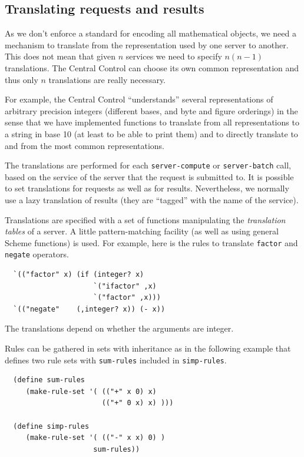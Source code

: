 \documentclass {article}
\begin{document}
\subsection{ Translating requests and results}

As we don't enforce a standard for encoding all mathematical objects, we need
a mechanism to translate from the representation used by one server to another.
This does not mean that given $n$ services we need to specify $n (n - 1)$
translations. The Central Control can choose its own common representation
and thus only $n$ translations are really necessary.

For example, the Central Control ``understands'' several representations of
arbitrary precision integers (different bases, and byte and figure
orderings) in the sense that we have implemented functions to translate from
all representations to a string in base 10 (at least to be able to print
them) and to directly translate to and from the most common representations.

The translations are performed for each {\tt server-compute} or
{\tt server-batch} call, based on the service of the server that the request
is submitted to. It is possible to set translations for requests as well as
for results. Nevertheless, we normally use a lazy translation of results 
(they are ``tagged'' with the name of the service).

Translations are specified with a set of functions manipulating the 
{\sl translation tables} of a server. A little pattern-matching facility (as
well as using general Scheme functions) is used. For example, here is the
rules to translate {\tt factor} and {\tt negate} operators.
\begin{verbatim} 
  `(("factor" x) (if (integer? x)
                     `("ifactor" ,x)
                     `("factor" ,x)))
  `(("negate"    (,integer? x)) (- x))
\end{verbatim} 
The translations depend on whether the arguments are integer.

Rules can be gathered in sets with inheritance as in the following example
that defines two rule sets with {\tt sum-rules} included in {\tt simp-rules}.
\begin{verbatim} 
  (define sum-rules
     (make-rule-set '( (("+" x 0) x)
                       (("+" 0 x) x) )))

  (define simp-rules
     (make-rule-set '( (("-" x x) 0) )
                     sum-rules))
\end{verbatim} 
\end{document}
